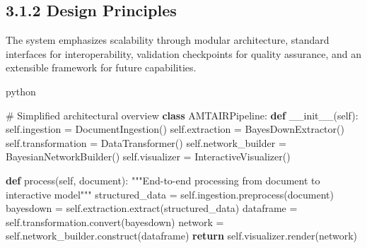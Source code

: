 \documentclass[
  11pt,
  letterpaper,
]{book}
\newenvironment{Shaded}{\begin{snugshade}}{\end{snugshade}}
\newcommand{\CommentTok}[1]{\textcolor[rgb]{0.37,0.37,0.37}{#1}}
\newcommand{\ControlFlowTok}[1]{\textcolor[rgb]{0.00,0.23,0.31}{\textbf{#1}}}
\newcommand{\FunctionTok}[1]{\textcolor[rgb]{0.28,0.35,0.67}{#1}}
\newcommand{\KeywordTok}[1]{\textcolor[rgb]{0.00,0.23,0.31}{\textbf{#1}}}
\newcommand{\NormalTok}[1]{\textcolor[rgb]{0.00,0.23,0.31}{#1}}
\newcommand{\OperatorTok}[1]{\textcolor[rgb]{0.37,0.37,0.37}{#1}}
\newcommand{\VariableTok}[1]{\textcolor[rgb]{0.07,0.07,0.07}{#1}}
\begin{document}
\subsection*{3.1.2 Design Principles}\label{sec-design-principles}

\begin{tcolorbox}[enhanced jigsaw, opacityback=0, leftrule=.75mm, breakable, coltitle=black, colbacktitle=quarto-callout-tip-color!10!white, bottomrule=.15mm, rightrule=.15mm, toprule=.15mm, left=2mm, bottomtitle=1mm, arc=.35mm, toptitle=1mm, titlerule=0mm, title=\textcolor{quarto-callout-tip-color}{\faLightbulb}\hspace{0.5em}{Core Design Philosophy}, opacitybacktitle=0.6, colframe=quarto-callout-tip-color-frame, colback=white]

The system emphasizes scalability through modular architecture, standard
interfaces for interoperability, validation checkpoints for quality
assurance, and an extensible framework for future capabilities.

\end{tcolorbox}

python

\begin{Shaded}
\begin{Highlighting}[]
\CommentTok{\# Simplified architectural overview}
\KeywordTok{class}\NormalTok{ AMTAIRPipeline:}
    \KeywordTok{def} \FunctionTok{\_\_init\_\_}\NormalTok{(}\VariableTok{self}\NormalTok{):}
        \VariableTok{self}\NormalTok{.ingestion }\OperatorTok{=}\NormalTok{ DocumentIngestion()}
        \VariableTok{self}\NormalTok{.extraction }\OperatorTok{=}\NormalTok{ BayesDownExtractor() }
        \VariableTok{self}\NormalTok{.transformation }\OperatorTok{=}\NormalTok{ DataTransformer()}
        \VariableTok{self}\NormalTok{.network\_builder }\OperatorTok{=}\NormalTok{ BayesianNetworkBuilder()}
        \VariableTok{self}\NormalTok{.visualizer }\OperatorTok{=}\NormalTok{ InteractiveVisualizer()}
    
    \KeywordTok{def}\NormalTok{ process(}\VariableTok{self}\NormalTok{, document):}
        \CommentTok{"""End{-}to{-}end processing from document to interactive model"""}
\NormalTok{        structured\_data }\OperatorTok{=} \VariableTok{self}\NormalTok{.ingestion.preprocess(document)}
\NormalTok{        bayesdown }\OperatorTok{=} \VariableTok{self}\NormalTok{.extraction.extract(structured\_data)}
\NormalTok{        dataframe }\OperatorTok{=} \VariableTok{self}\NormalTok{.transformation.convert(bayesdown)}
\NormalTok{        network }\OperatorTok{=} \VariableTok{self}\NormalTok{.network\_builder.construct(dataframe)}
        \ControlFlowTok{return} \VariableTok{self}\NormalTok{.visualizer.render(network)}
\end{Highlighting}
\end{Shaded}
\end{document}
